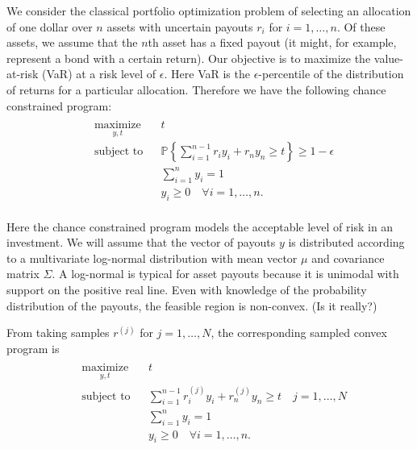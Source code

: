 \documentclass[12pt]{article}
\begin{document}
We consider the classical portfolio optimization problem of selecting an allocation of one dollar over $n$ assets with uncertain payouts $r_i$ for $i = 1, \ldots, n$.
Of these assets, we assume that the $n$th asset has a fixed payout (it might, for example, represent a bond with a certain return).
Our objective is to maximize the value-at-risk (VaR) at a risk level of $\epsilon$.
Here VaR is the $\epsilon$-percentile of the distribution of returns for a particular allocation.
Therefore we have the following chance constrained program:
\begin{align}\label{Portfolioccp}
\begin{split}
\begin{aligned}
    & \underset{y, t}{\text{maximize}}
    & & t \\
    & \text{subject to}
    & & \mathbb{P}\left\{ \sum_{i=1}^{n-1} r_i y_i + r_n y_n \geq t \right\} \geq 1-\epsilon \\
    & & & \sum_{i=1}^n y_i = 1 \\
    & & & y_i \geq 0 \quad \forall i = 1, \ldots, n.
\end{aligned}
\end{split} \tag{Portfolio CCP}
\end{align}

Here the chance constrained program models the acceptable level of risk in an investment.
We will assume that the vector of payouts $y$ is distributed according to a multivariate log-normal distribution with mean vector $\mu$ and covariance matrix $\Sigma$.
A log-normal is typical for asset payouts because it is unimodal with support on the positive real line.
Even with knowledge of the probability distribution of the payouts, the feasible region is non-convex. (Is it really?)


From taking samples $r^{(j)}$ for $j = 1, \ldots, N$, the corresponding sampled convex program is 
\begin{align}\label{Portfolioscp}
\begin{split}
\begin{aligned}
    & \underset{y, t}{\text{maximize}}
    & & t \\
    & \text{subject to}
    & & \sum_{i=1}^{n-1} r_i^{(j)} y_i + r_n^{(j)} y_n \geq t \quad j = 1, \ldots, N \\
    & & & \sum_{i=1}^n y_i = 1 \\
    & & & y_i \geq 0 \quad \forall i = 1, \ldots, n.
\end{aligned}
\end{split} \tag{Portfolio SCP$_N$}
\end{align}
\end{document}
